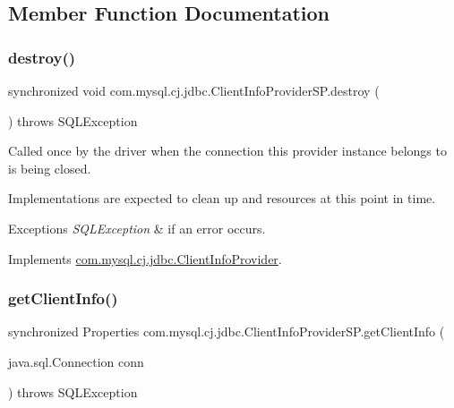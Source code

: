 \subsection{Member Function Documentation}
\mbox{\label{classcom_1_1mysql_1_1cj_1_1jdbc_1_1_client_info_provider_s_p_af68fc4a5dc0ca1325f17b78a19a5a3ff}} 
\subsubsection{\texorpdfstring{destroy()}{destroy()}}
{\footnotesize\ttfamily synchronized void com.\+mysql.\+cj.\+jdbc.\+Client\+Info\+Provider\+S\+P.\+destroy (\begin{DoxyParamCaption}{ }\end{DoxyParamCaption}) throws S\+Q\+L\+Exception}

Called once by the driver when the connection this provider instance belongs to is being closed.

Implementations are expected to clean up and resources at this point in time.


\begin{DoxyExceptions}{Exceptions}
{\em S\+Q\+L\+Exception} & if an error occurs. \\
\hline
\end{DoxyExceptions}


Implements \mbox{\hyperlink{interfacecom_1_1mysql_1_1cj_1_1jdbc_1_1_client_info_provider_a994581557bab4982ec5699fa1114ef5a}{com.\+mysql.\+cj.\+jdbc.\+Client\+Info\+Provider}}.

\mbox{\label{classcom_1_1mysql_1_1cj_1_1jdbc_1_1_client_info_provider_s_p_a27dcf12911f0de535b6653135bf10e9e}} 
\subsubsection{\texorpdfstring{get\+Client\+Info()}{getClientInfo()}\hspace{0.1cm}{\footnotesize\ttfamily [1/2]}}
{\footnotesize\ttfamily synchronized Properties com.\+mysql.\+cj.\+jdbc.\+Client\+Info\+Provider\+S\+P.\+get\+Client\+Info (\begin{DoxyParamCaption}\item[{java.\+sql.\+Connection}]{conn }\end{DoxyParamCaption}) throws S\+Q\+L\+Exception}


